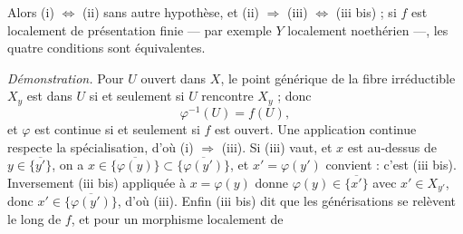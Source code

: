\documentclass[11pt,a4paper]{article}
\begin{document}
Alors (i) $\Leftrightarrow$ (ii) sans autre hypothèse, et
(ii) $\Rightarrow$ (iii) $\Leftrightarrow$ (iii bis) ; si $f$ est localement de
présentation finie --- par exemple $Y$ localement noethérien ---, les quatre
conditions sont équivalentes.

\emph{Démonstration.} Pour $U$ ouvert dans $X$, le point générique de la fibre
irréductible $X_y$ est dans $U$ si et seulement si $U$ rencontre $X_y$ ; donc
\[
  \varphi^{-1}(U) = f(U),
\]
et $\varphi$ est continue si et seulement si $f$ est ouvert. Une application
continue respecte la spécialisation, d'où (i) $\Rightarrow$ (iii). Si (iii)
vaut, et $x$ est au-dessus de $y \in \overline{\{y'\}}$, on a
$x \in \overline{\{\varphi(y)\}} \subset \overline{\{\varphi(y')\}}$, et
$x' = \varphi(y')$ convient : c'est (iii bis). Inversement (iii bis) appliquée
à $x = \varphi(y)$ donne $\varphi(y) \in \overline{\{x'\}}$ avec $x' \in X_{y'}$,
donc $x' \in \overline{\{\varphi(y')\}}$, d'où (iii). Enfin (iii bis) dit que les
générisations se relèvent le long de $f$, et pour un morphisme localement de
\end{document}
